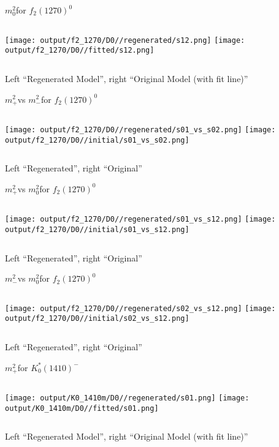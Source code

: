 \documentclass{beamer}
\newcommand{\MP}{\ensuremath{m^2_+}}
\newcommand{\MM}{\ensuremath{m^2_-}}
\newcommand{\MZ}{\ensuremath{m^2_0}}
\begin{document}
\begin{frame}{\MZ for $f_2(1270)^0$}
\begin{columns}[t]
\centering
\texttt{[image: output/f2\_1270/D0//regenerated/s12.png]}
\centering
\texttt{[image: output/f2\_1270/D0//fitted/s12.png]}
\end{columns}
    \centering
    Left ``Regenerated Model'', right ``Original Model (with fit line)''
\end{frame}                   


\begin{frame}{\MP vs \MM for $f_2(1270)^0$}
\begin{columns}[t]
\centering
\texttt{[image: output/f2\_1270/D0//regenerated/s01\_vs\_s02.png]}
\centering
\texttt{[image: output/f2\_1270/D0//initial/s01\_vs\_s02.png]}
\end{columns}
    \centering
    Left ``Regenerated'', right ``Original''
\end{frame} 


\begin{frame}{\MP vs \MZ for $f_2(1270)^0$}
\begin{columns}[t]
\centering
\texttt{[image: output/f2\_1270/D0//regenerated/s01\_vs\_s12.png]}
\centering
\texttt{[image: output/f2\_1270/D0//initial/s01\_vs\_s12.png]}
\end{columns}
    \centering
    Left ``Regenerated'', right ``Original''
\end{frame} 


\begin{frame}{\MM vs \MZ for $f_2(1270)^0$}
\begin{columns}[t]
\centering
\texttt{[image: output/f2\_1270/D0//regenerated/s02\_vs\_s12.png]}
\centering
\texttt{[image: output/f2\_1270/D0//initial/s02\_vs\_s12.png]}
\end{columns}
    \centering
    Left ``Regenerated'', right ``Original''
\end{frame} 

\begin{frame}{\MP for $K_0^*(1410)^-$}
\begin{columns}[t]
\centering
\texttt{[image: output/K0\_1410m/D0//regenerated/s01.png]}
\centering
\texttt{[image: output/K0\_1410m/D0//fitted/s01.png]}
\end{columns}
    \centering
    Left ``Regenerated Model'', right ``Original Model (with fit line)''
\end{frame}                   
\end{document}
